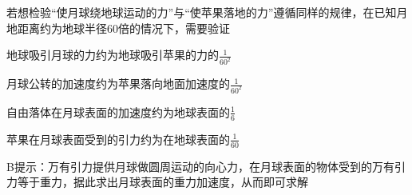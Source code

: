 若想检验“使月球绕地球运动的力”与“使苹果落地的力”遵循同样的规律，在已知月地距离约为地球半径60倍的情况下，需要验证\paren[]
\begin{choices}
	\item 地球吸引月球的力约为地球吸引苹果的力的\(\frac{1}{60^2}\)
	\item 月球公转的加速度约为苹果落向地面加速度的\(\frac{1}{60^2}\)
	\item 自由落体在月球表面的加速度约为地球表面的\(\frac{1}{6}\)
	\item 苹果在月球表面受到的引力约为在地球表面的\(\frac{1}{60}\)
\end{choices}
\begin{answer}
	B\qquad 提示：万有引力提供月球做圆周运动的向心力，在月球表面的物体受到的万有引力等于重力，据此求出月球表面的重力加速度，从而即可求解
\end{answer}
